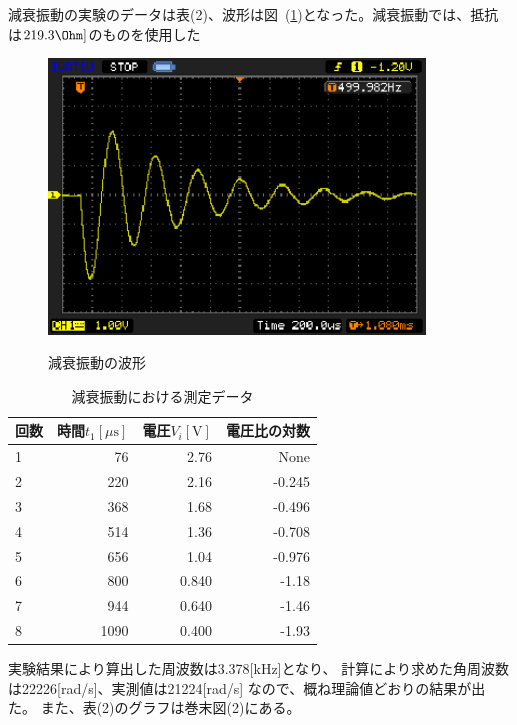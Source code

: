 \documentclass[a4j,10pt]{jarticle}
\newcommand{\Figref}[1]{図~(\ref{#1})}
\begin{document}
減衰振動の実験のデータは表(2)、波形は\Figref{Gensui}となった。減衰振動では、抵抗は$219.3\mathrm \Ohm]$のものを使用した
\begin{figure}[h]
\begin{center}
\includegraphics[width=10cm]{freq.eps}
\label{Gensui}
\caption{減衰振動の波形}
\end{center}
\end{figure}
\begin{table}[h]
\begin{center}
\label{GensuiD}
\caption{減衰振動における測定データ}
\begin{tabular}{|l|r|r|r|}
\hline
回数 & 時間$t_{1}[\mu \mathrm s]$ & 電圧$V_{i}[\mathrm V]$ & 電圧比の対数 \\ \hline \hline
1 & 76 & 2.76 & None \\ \hline
2 & 220 & 2.16 & -0.245 \\ \hline
3 & 368 & 1.68 & -0.496 \\ \hline
4 & 514 & 1.36 & -0.708 \\ \hline
5 & 656 & 1.04 & -0.976 \\ \hline
6 & 800 & 0.840 & -1.18 \\ \hline
7 & 944 & 0.640 & -1.46 \\ \hline
8 & 1090 & 0.400 &-1.93 \\ \hline
\end{tabular}
\end{center}
\end{table}

実験結果により算出した周波数は3.378[kHz]となり、
計算により求めた角周波数は22226[rad/s]、実測値は21224[rad/s]
なので、概ね理論値どおりの結果が出た。
また、表(2)のグラフは巻末図(2)にある。
\end{document}
